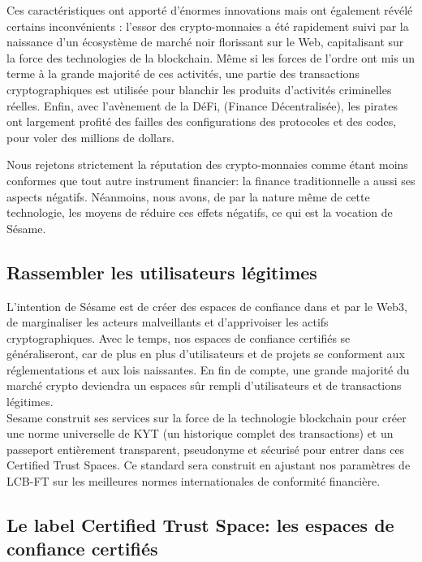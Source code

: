 ﻿\documentclass[a4paper]{article}
\let\OldTexttrademark\texttrademark
\renewcommand{\texttrademark}{\OldTexttrademark\xspace}%
\begin{document}
Ces caractéristiques ont apporté d’énormes innovations mais ont également révélé certains inconvénients : l'essor des crypto-monnaies a été rapidement suivi par la naissance d'un écosystème de marché noir florissant sur le Web, capitalisant sur la force des technologies de la blockchain. Même si les forces de l'ordre ont mis un terme à la grande majorité de ces activités, une partie des transactions cryptographiques est utilisée pour blanchir les produits d'activités criminelles réelles. Enfin, avec l'avènement de la DéFi, (Finance Décentralisée), les pirates ont largement profité des failles des configurations des protocoles et des codes, pour voler des millions de dollars. 

Nous rejetons strictement la réputation des crypto-monnaies comme étant moins conformes que tout autre instrument financier: la finance traditionnelle a aussi ses aspects négatifs. Néanmoins, nous avons, de par la nature même de cette technologie, les moyens de réduire ces effets négatifs, ce qui est la vocation de Sésame.

\subsection{Rassembler les utilisateurs légitimes}
L'intention de Sésame est de créer des espaces de confiance dans et par le Web3, de marginaliser les acteurs malveillants et d'apprivoiser les actifs cryptographiques. Avec le temps, nos espaces de confiance certifiés se généraliseront, car de plus en plus d'utilisateurs et de projets se conforment aux réglementations et aux lois naissantes. En fin de compte, une grande majorité du marché crypto deviendra un espaces sûr rempli d'utilisateurs et de transactions légitimes. \\

Sesame construit ses services sur la force de la technologie blockchain pour créer une norme universelle de KYT (un historique complet des transactions) et un passeport entièrement transparent, pseudonyme et sécurisé pour entrer dans ces Certified Trust Spaces\OldTexttrademark. Ce standard sera construit en ajustant nos paramètres de LCB-FT sur les meilleures normes internationales de conformité financière.

\subsection{Le label Certified Trust Space\texttrademark : les espaces de confiance certifiés}
\end{document}
